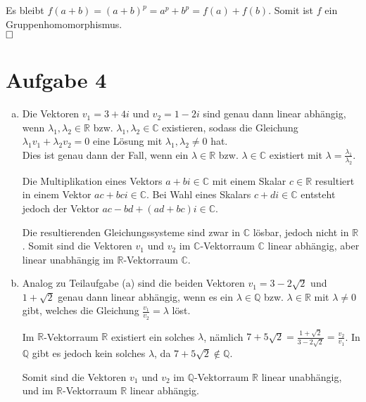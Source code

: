 \documentclass[12pt,a4paper]{article}
\newcommand{\qed}{\null\nobreak\hfill\square}
\begin{document}
Es bleibt $f(a+b) = (a+b)^p = a^p + b^p = f(a) + f(b)$.
Somit ist $f$ ein Gruppenhomomorphismus.\\
$\qed$

\pagebreak
\section*{Aufgabe 4}

\begin{enumerate}[(a)]
    \item Die Vektoren $v_1 = 3 + 4i$ und $v_2 = 1 - 2i$ sind genau dann linear abhängig, wenn $\lambda_1,\lambda_2 \in \mathbb{R}$ bzw. $\lambda_1,\lambda_2 \in \mathbb{C}$ existieren, sodass die Gleichung $\lambda_1v_1 + \lambda_2 v_2 = 0$ eine Lösung mit $\lambda_1,\lambda_2 \neq 0$ hat.\\
    Dies ist genau dann der Fall, wenn ein $\lambda \in \mathbb{R}$ bzw. $\lambda \in \mathbb{C}$ existiert mit $\lambda = \frac{\lambda_1}{\lambda_2}$.

    Die Multiplikation eines Vektors $a + bi \in \mathbb{C}$ mit einem Skalar $c \in \mathbb{R}$ resultiert in einem Vektor $ac +bci \in \mathbb{C}$. Bei Wahl eines Skalars $c + di \in \mathbb{C}$ entsteht jedoch der Vektor $ac - bd + (ad + bc)i \in \mathbb{C}$.

    Die resultierenden Gleichungssysteme sind zwar in $\mathbb{C}$ lösbar, jedoch nicht in $\mathbb{R}$. Somit sind die Vektoren $v_1$ und $v_2$ im $\mathbb{C}$-Vektorraum $\mathbb{C}$ linear abhängig, aber linear unabhängig im $\mathbb{R}$-Vektorraum $\mathbb{C}$.

    \item Analog zu Teilaufgabe (a) sind die beiden Vektoren $v_1 = 3 - 2\sqrt{2}$ und $1 + \sqrt{2}$ genau dann linear abhängig, wenn es ein $\lambda \in \mathbb{Q}$ bzw. $\lambda \in \mathbb{R}$ mit $\lambda \neq 0$ gibt, welches die Gleichung $\frac{v_1}{v_2} = \lambda$ löst.

    Im $\mathbb{R}$-Vektorraum $\mathbb{R}$ existiert ein solches $\lambda$, nämlich $7 + 5\sqrt{2} = \frac{1+\sqrt{2}}{3-2\sqrt{2}} = \frac{v_2}{v_1}$.
    In $\mathbb{Q}$ gibt es jedoch kein solches $\lambda$, da $7+5\sqrt{2} \notin \mathbb{Q}$.

    Somit sind die Vektoren $v_1$ und $v_2$ im $\mathbb{Q}$-Vektorraum $\mathbb{R}$ linear unabhängig, und im $\mathbb{R}$-Vektorraum $\mathbb{R}$ linear abhängig.
\end{enumerate}


\end{document}
